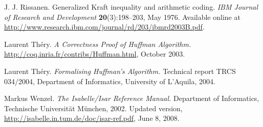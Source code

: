 \documentclass[11pt,a4paper]{article}
\begin{document}
\begin{thebibliography}{[9]}
 J. J. Rissanen.
Generalized Kraft inequality and arithmetic coding. {\sl IBM
Journal of Research and Development\/} {\bf 20}(3):198--203, May 1976.
Available online at
\url{http://www.research.ibm.com/journal/rd/203/ibmrd2003B.pdf}.

 Laurent Th\'ery. {\sl A Correctness Proof of Huffman
Algorithm.} \url{http://coq.inria.fr/contribs/Huffman.html}, October 2003.

 Laurent Th\'ery. {\sl Formalising Huffman's Algorithm.}
Technical report TRCS 034/2004, Department of Informatics, University of
L'Aquila, 2004.

 Markus Wenzel. {\sl The Isabelle/Isar Reference Manual.}
Department of Informatics, Technische Universit\"at M\"unchen, 2002. Updated
version, \url{http://isabelle.in.tum.de/doc/isar-ref.pdf}, June 8, 2008.

\end{thebibliography}
\end{document}
